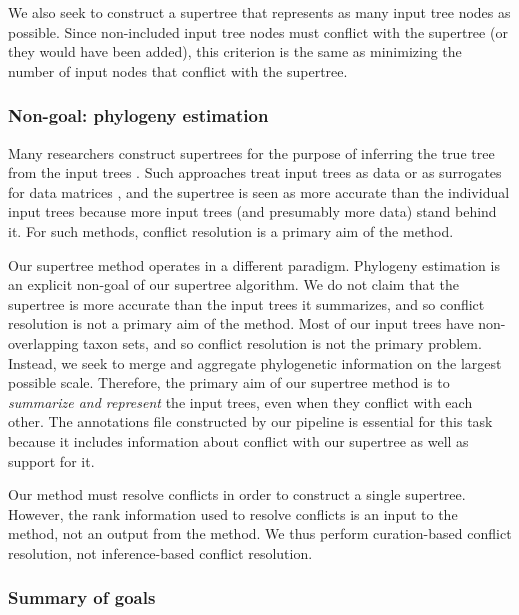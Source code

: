 \documentclass[fleqn,12pt,lineno,english]{wlpeerj}
\begin{document}
We also seek to construct a supertree that represents as many input
tree nodes as possible. Since non-included input tree nodes must conflict
with the supertree (or they would have been added), this criterion
is the same as minimizing the number of input nodes that conflict
with the supertree.

\subsubsection{Non-goal: phylogeny estimation}
Many researchers construct supertrees for the purpose of inferring the true tree from the input trees \citep{BinindaEmonds2007b,Davis2014}.  Such approaches treat input trees as data or as surrogates for data matrices \citep{gatesy2004critique}, and the supertree is seen as more accurate than the individual input trees because more input trees (and presumably more data) stand behind it.  For such methods, conflict resolution is a primary aim of the method.

Our supertree method operates in a different paradigm.  Phylogeny estimation is an explicit non-goal of our supertree algorithm.  We do not claim that the supertree is more accurate than the input trees it summarizes, and so conflict resolution is not a primary aim of the method. Most of our input trees have non-overlapping taxon sets, and so conflict resolution is not the primary problem.  Instead, we seek to merge and aggregate phylogenetic information on the largest possible scale.  Therefore, the primary aim of our supertree method is to \emph{summarize and represent} the input trees, even when they conflict with each other.  The annotations file constructed by our pipeline is essential for this task because it includes information about conflict with our supertree as well as support for it.

Our method must resolve conflicts in order to construct a single supertree.  However, the rank information used to resolve conflicts is an input to the method, not an output from the method.  We thus perform curation-based conflict resolution, not inference-based conflict resolution.

\subsubsection{Summary of goals}
\end{document}
